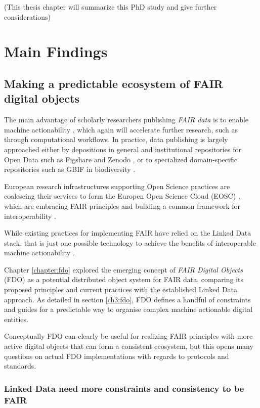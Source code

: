 (This thesis chapter will summarize this PhD study and give further
considerations)

\section{Main Findings}

\subsection{Making a predictable ecosystem of FAIR digital objects}

The main advantage of scholarly researchers publishing \emph{FAIR data} is to enable machine actionability \cite{Wilkinson 2016}, which again will accelerate further research, such as through computational workflows. 
In practice, data publishing is largely approached either by depositions in general and institutional repositories for Open Data such as Figshare and Zenodo \cite{Dillen 2019}, or to specialized domain-specific repositories such as GBIF in biodiversity \cite{ch8-7}. 

European research infrastructures supporting Open Science practices are coalescing their services to form the Europen Open Science Cloud (EOSC) \cite{10.2777/940154}, which are embracing FAIR principles \cite{Mons 2017} and building a common framework for interoperability \cite{eosc-interop-framework}. 

While existing practices for implementing FAIR have relied on the Linked Data stack, that is just one possible technology to achieve the benefits of interoperable machine actionability \cite{Mons 2017}. 

Chapter \ref{chapter:fdo} explored the emerging concept of \emph{FAIR Digital Objects} (FDO) \cite{Schultes 2019} as a potential distributed object system for FAIR data, comparing its proposed principles and current practices with the established Linked Data approach. 
As detailed in section \vref{ch3:fdo}, FDO defines a handful of constraints and guides for a predictable way to organise complex machine actionable digital entities. 

Conceptually FDO can clearly be useful for realizing FAIR principles with more active digital objects that can form a consistent ecosystem, but this opens many questions on actual FDO implementations with regards to protocols and standards.

\subsubsection{Linked Data need more constraints and consistency to be FAIR}

